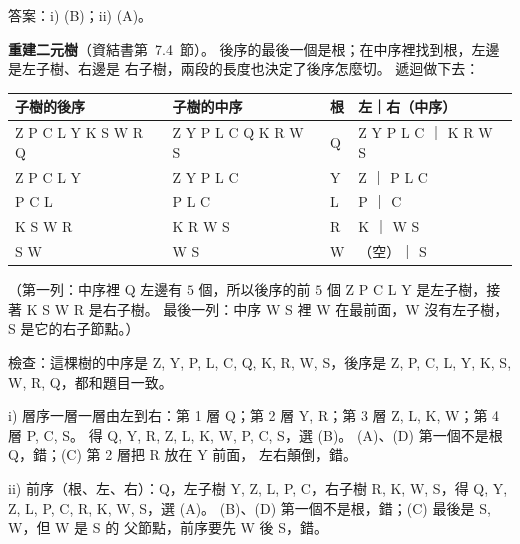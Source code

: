 \begin{pastsoln}
答案：i) (B)；ii) (A)。

\textbf{重建二元樹}（資結書第~7.4~節）。 後序的最後一個是根；在中序裡找到根，左邊是左子樹、右邊是
右子樹，兩段的長度也決定了後序怎麼切。 遞迴做下去：
\begin{center}
\small
\begin{tabular}{llll}
\toprule
子樹的後序 & 子樹的中序 & 根 & 左｜右（中序） \\
\midrule
Z P C L Y K S W R Q & Z Y P L C Q K R W S & Q & Z Y P L C ｜ K R W S \\
Z P C L Y & Z Y P L C & Y & Z ｜ P L C \\
P C L & P L C & L & P ｜ C \\
K S W R & K R W S & R & K ｜ W S \\
S W & W S & W & （空）｜ S \\
\bottomrule
\end{tabular}
\end{center}
（第一列：中序裡 Q 左邊有 $5$ 個，所以後序的前 $5$ 個 Z P C L Y 是左子樹，接著 K S W R 是右子樹。
最後一列：中序 W S 裡 W 在最前面，W 沒有左子樹，S 是它的右子節點。）
\begin{center}
\end{center}
檢查：這棵樹的中序是 Z, Y, P, L, C, Q, K, R, W, S，後序是 Z, P, C, L, Y, K, S, W, R, Q，都和題目一致。

i) 層序一層一層由左到右：第 1 層 Q；第 2 層 Y, R；第 3 層 Z, L, K, W；第 4 層 P, C, S。 得
Q, Y, R, Z, L, K, W, P, C, S，選 (B)。 (A)、(D) 第一個不是根 Q，錯；(C) 第 2 層把 R 放在 Y 前面，
左右顛倒，錯。

ii) 前序（根、左、右）：Q，左子樹 Y, Z, L, P, C，右子樹 R, K, W, S，得
Q, Y, Z, L, P, C, R, K, W, S，選 (A)。 (B)、(D) 第一個不是根，錯；(C) 最後是 S, W，但 W 是 S 的
父節點，前序要先 W 後 S，錯。
\end{pastsoln}
